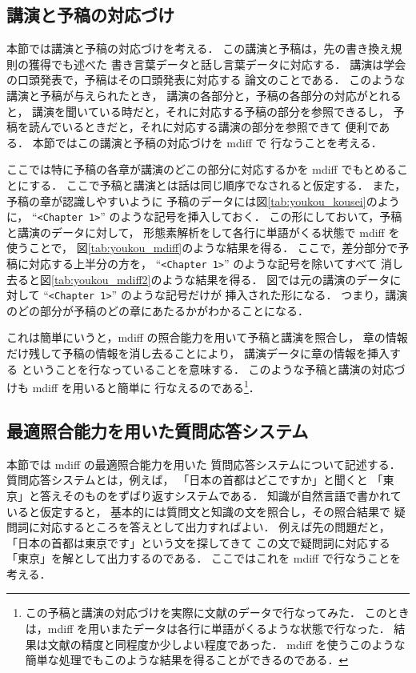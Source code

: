\subsection{講演と予稿の対応づけ}
\label{sec:sp_merge}

本節では講演と予稿の対応づけ\cite{uchimoto2001}を考える．
この講演と予稿は，先の書き換え規則の獲得でも述べた
書き言葉データと話し言葉データに対応する．
講演は学会の口頭発表で，予稿はその口頭発表に対応する
論文のことである．
このような講演と予稿が与えられたとき，
講演の各部分と，予稿の各部分の対応がとれると，
講演を聞いている時だと，それに対応する予稿の部分を参照できるし，
予稿を読んでいるときだと，それに対応する講演の部分を参照できて
便利である\cite{uchimoto2001,fujii_kaiho_2001}．
本節ではこの講演と予稿の対応づけを mdiff で
行なうことを考える．

ここでは特に予稿の各章が講演のどこの部分に対応するかを
 mdiff でもとめることにする．
ここで予稿と講演とは話は同じ順序でなされると仮定する．
また，予稿の章が認識しやすいように
予稿のデータには図\ref{tab:youkou_kousei}のように，
``\verb+<Chapter 1>+'' のような記号を挿入しておく．
この形にしておいて，予稿と講演のデータに対して，
形態素解析をして各行に単語がくる状態で mdiff を使うことで，
図\ref{tab:youkou_mdiff}のような結果を得る．
ここで，差分部分で予稿に対応する上半分の方を，
``\verb+<Chapter 1>+'' のような記号を除いてすべて
消し去ると図\ref{tab:youkou_mdiff2}のような結果を得る．
図では元の講演のデータに対して ``\verb+<Chapter 1>+'' のような記号だけが
挿入された形になる．
つまり，講演のどの部分が予稿のどの章にあたるかがわかることになる．

これは簡単にいうと，mdiff の照合能力を用いて予稿と講演を照合し，
章の情報だけ残して予稿の情報を消し去ることにより，
講演データに章の情報を挿入する
ということを行なっていることを意味する．
このような予稿と講演の対応づけも mdiff を用いると簡単に
行なえるのである\footnote{この予稿と講演の対応づけを実際に文献\cite{uchimoto2001}のデータで行なってみた．
このときは，mdiff を用いまたデータは各行に単語がくるような状態で行なった．
結果は文献\cite{uchimoto2001}の精度と同程度か少しよい程度であった．
mdiff を使うこのような簡単な処理でもこのような結果を得ることができるのである．}．

\subsection{最適照合能力を用いた質問応答システム}
\label{sec:qa}

本節では mdiff の最適照合能力を用いた
質問応答システム\cite{qa_memo,murata2000_1_nl,murata_QA_nlp2000ws,murata_nlp2001ws_true}について記述する．
質問応答システムとは，例えば，
「日本の首都はどこですか」と聞くと
「東京」と答えそのものをずばり返すシステムである．
知識が自然言語で書かれていると仮定すると，
基本的には質問文と知識の文を照合し，その照合結果で
疑問詞に対応するところを答えとして出力すればよい．
例えば先の問題だと，
「日本の首都は東京です」という文を探してきて
この文で疑問詞に対応する「東京」を解として出力するのである．
ここではこれを mdiff で行なうことを考える．


